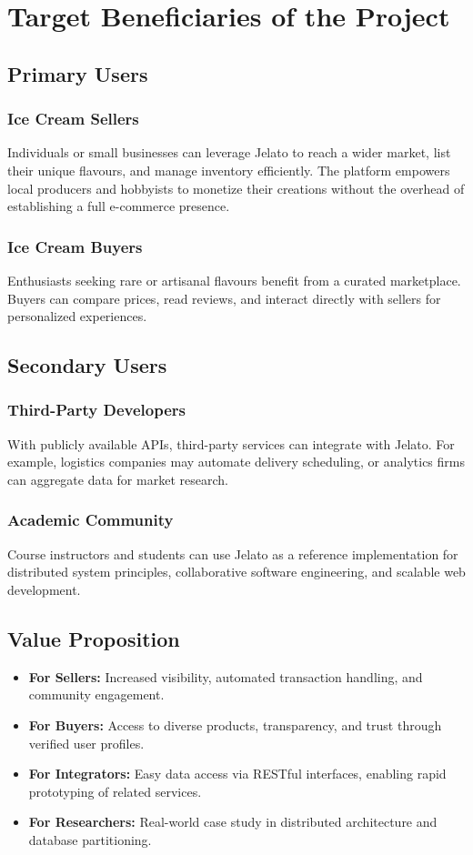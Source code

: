 \documentclass[12pt,a4paper]{report}
\begin{document}
\chapter{Target Beneficiaries of the Project}
\section{Primary Users}
\subsection*{Ice Cream Sellers}
Individuals or small businesses can leverage Jelato to reach a wider market, list their unique flavours, and manage inventory efficiently. The platform empowers local producers and hobbyists to monetize their creations without the overhead of establishing a full e-commerce presence.

\subsection*{Ice Cream Buyers}
Enthusiasts seeking rare or artisanal flavours benefit from a curated marketplace. Buyers can compare prices, read reviews, and interact directly with sellers for personalized experiences.

\section{Secondary Users}
\subsection*{Third-Party Developers}
With publicly available APIs, third-party services can integrate with Jelato. For example, logistics companies may automate delivery scheduling, or analytics firms can aggregate data for market research.

\subsection*{Academic Community}
Course instructors and students can use Jelato as a reference implementation for distributed system principles, collaborative software engineering, and scalable web development.

\section{Value Proposition}
\begin{itemize}
    \item \textbf{For Sellers:} Increased visibility, automated transaction handling, and community engagement.
    \item \textbf{For Buyers:} Access to diverse products, transparency, and trust through verified user profiles.
    \item \textbf{For Integrators:} Easy data access via RESTful interfaces, enabling rapid prototyping of related services.
    \item \textbf{For Researchers:} Real-world case study in distributed architecture and database partitioning.
\end{itemize}
\end{document}
